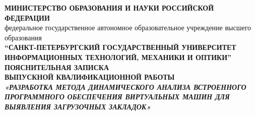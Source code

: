 \begin{titlepage}
	\newpage

	\begin{center}
		\textbf{МИНИСТЕРСТВО ОБРАЗОВАНИЯ И НАУКИ РОССИЙСКОЙ ФЕДЕРАЦИИ\\}
		федеральное государственное автономное образовательное учреждение высшего образования\\
		\textbf{“САНКТ-ПЕТЕРБУРГСКИЙ ГОСУДАРСТВЕННЫЙ УНИВЕРСИТЕТ\\
		ИНФОРМАЦИОННЫХ ТЕХНОЛОГИЙ, МЕХАНИКИ И ОПТИКИ”\\}
		\vspace{1.5cm}
		\textbf{ПОЯСНИТЕЛЬНАЯ ЗАПИСКА\\
			ВЫПУСКНОЙ КВАЛИФИКАЦИОННОЙ РАБОТЫ}\\
		\vspace{3.0cm}
		\textsc{\textit{\textbf{
		«РАЗРАБОТКА МЕТОДА ДИНАМИЧЕСКОГО АНАЛИЗА ВСТРОЕННОГО ПРОГРАММНОГО ОБЕСПЕЧЕНИЯ ВИРТУАЛЬНЫХ МАШИН ДЛЯ ВЫЯВЛЕНИЯ ЗАГРУЗОЧНЫХ ЗАКЛАДОК»
		}}}
		\\
	\end{center}

	\vspace{\fill}

	\newlength{\ML}

	\newlength{\AllWidth}
	\setlength{\AllWidth}{0.7\textwidth}
	\newlength{\SubWidth}
	\setlength{\SubWidth}{0.05\textwidth}
	\newlength{\Sign}
	\setlength{\Sign}{3cm}
	\newlength{\FIO}
	\settowidth{\FIO}{Автор\ \ }
	\newlength{\pFIO}
	\setlength{\pFIO}{\AllWidth-\FIO-\Sign-\SubWidth}
	\newlength{\Spec}
	\settowidth{\Spec}{Направление подготовки (специальность)\ }
	\newlength{\pSpec}
	\setlength{\pSpec}{\AllWidth-\Spec-\SubWidth}
	\newlength{\Qual}
	\settowidth{\Qual}{Квалификация\ }
	\newlength{\pQual}
	\setlength{\pQual}{\AllWidth-\Qual-\SubWidth}
	\newlength{\Ruler}
	\settowidth{\Ruler}{Руководитель\ \ }
	\newlength{\pRuler}
	\setlength{\pRuler}{\AllWidth-\Ruler-\Sign-\SubWidth}
	\newlength{\CRuler}
	\settowidth{\CRuler}{Зав. кафедрой\ \ }
	\newlength{\pCRuler}
	\setlength{\pCRuler}{\AllWidth-\CRuler-\Sign-\SubWidth}
	\newlength{\AllowProtect}
	\newlength{\pAllowProtect}
	\setlength{\pAllowProtect}{\AllWidth-\SubWidth-\AllowProtect}


\end{titlepage}
